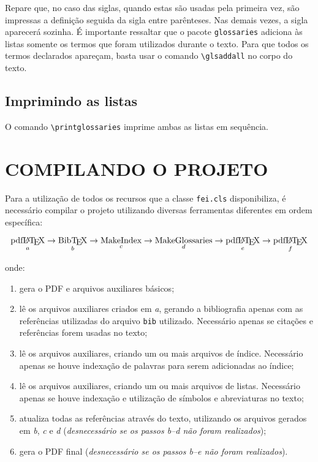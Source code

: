 \documentclass{fei}
\begin{document}
	Repare que, no caso das siglas, quando estas são usadas pela primeira vez, são impressas a definição seguida da sigla entre parênteses. Nas demais vezes, a sigla aparecerá sozinha. É importante ressaltar que o pacote \texttt{glossaries} adiciona às listas somente os termos que foram utilizados durante o texto. Para que todos os termos declarados apareçam, basta usar o comando \verb+\glsaddall+ no corpo do texto.
	
	\section{Imprimindo as listas}
	
	O comando \verb+\printglossaries+ imprime ambas as listas em sequência.

	\chapter{COMPILANDO O PROJETO} \label{chap:compilando}
	
	Para a utilização de todos os recursos que a classe \verb+fei.cls+ disponibiliza, é necessário compilar o projeto utilizando diversas ferramentas diferentes em ordem específica:
	
	\[\operatorname*{\text{pdf\LaTeX}}_a \to \operatorname*{\text{Bib\TeX}}_b \to \operatorname*{\text{MakeIndex}}_c \to \operatorname*{\text{MakeGlossaries}}_d \to \operatorname*{\text{pdf\LaTeX}}_e \to \operatorname*{\text{pdf\LaTeX}}_f\]
	
	onde:
	
	\begin{enumerate}
	\item gera o PDF e arquivos auxiliares básicos;
	\item lê os arquivos auxiliares criados em \emph{a}, gerando a bibliografia apenas com as referências utilizadas do arquivo \texttt{bib} utilizado. Necessário apenas se citações e referências forem usadas no texto;
	\item lê os arquivos auxiliares, criando um ou mais arquivos de índice. Necessário apenas se houve indexação de palavras para serem adicionadas ao índice;
	\item lê os arquivos auxiliares, criando um ou mais arquivos de listas. Necessário apenas se houve indexação e utilização de símbolos e abreviaturas no texto;
	\item atualiza todas as referências através do texto, utilizando os arquivos gerados em \emph{b}, \emph{c} e \emph{d} (\emph{desnecessário se os passos b--d não foram realizados});
	\item gera o PDF final (\emph{desnecessário se os passos b--e não foram realizados}).
	\end{enumerate}
	
\end{document}
